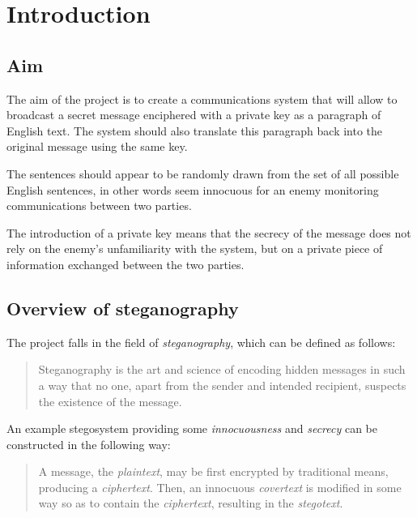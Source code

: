 \documentclass[draft]{IIBproject}
\begin{document}
\cleardoublepage

\pagestyle{empty}
\tableofcontents
\cleardoublepage

\pagestyle{plain}

\section{Introduction}

\subsection{Aim}

The aim of the project is to create a communications system that will allow to broadcast a secret message enciphered with a private key as a paragraph of English text. The system should also translate this paragraph back into the original message using the same key.

The sentences should appear to be randomly drawn from the set of all possible English sentences, in other words seem innocuous for an enemy monitoring communications between two parties.

The introduction of a private key means that the secrecy of the message does not rely on the enemy's unfamiliarity with the system, but on a private piece of information exchanged between the two parties.

\subsection{Overview of steganography}

The project falls in the field of \emph{steganography}, which can be defined as follows:

\begin{quote} Steganography is the art and science of encoding hidden messages in such a way that no one, apart from the sender and intended recipient, suspects the existence of the message. \cite{wiki:steganography} \end{quote}

An example stegosystem providing some \emph{innocuousness} and \emph{secrecy} can be constructed in the following way:

\begin{quote} A message, the \emph{plaintext}, may be first encrypted by traditional means, producing a \emph{ciphertext}. Then, an innocuous \emph{covertext} is modified in some way so as to contain the \emph{ciphertext}, resulting in the \emph{stegotext}. \cite{wiki:steganography} \end{quote}
\end{document}
